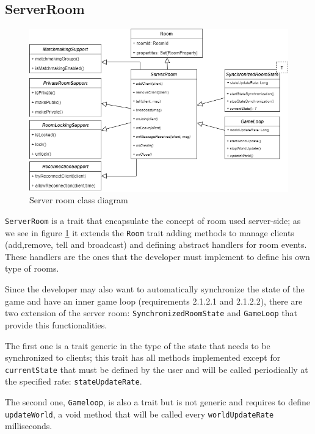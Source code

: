 \subsection{ServerRoom}
\begin{figure}[H]
	\centering
	\includegraphics[scale=0.5]{images/4-design/server-room.png}
	\caption{Server room class diagram}
	\label{fig:server_room_class_diagram}
\end{figure}
\texttt{ServerRoom} is a trait that encapsulate the concept of room used server-side; as we see in figure \ref{fig:server_room_class_diagram} it extends the \texttt{Room} trait adding methods to manage clients (add,remove, tell and broadcast) and defining abstract handlers for room events. These handlers are the ones that the developer must implement to define his own type of rooms.

Since the developer may also want to automatically synchronize the state of the game and have an inner game loop (requirements 2.1.2.1 and 2.1.2.2), there are two extension of the server room: \texttt{SynchronizedRoomState} and \texttt{GameLoop} that provide this functionalities. 

The first one is a trait generic in the type of the state that needs to be synchronized to clients; this trait has all methods implemented except for \texttt{currentState} that must be defined by the user and will be called periodically at the specified rate: \texttt{stateUpdateRate}.

The second one, \texttt{Gameloop}, is also a trait but is not generic and requires to define \texttt{updateWorld}, a void method that will be called every \texttt{worldUpdateRate} milliseconds.

